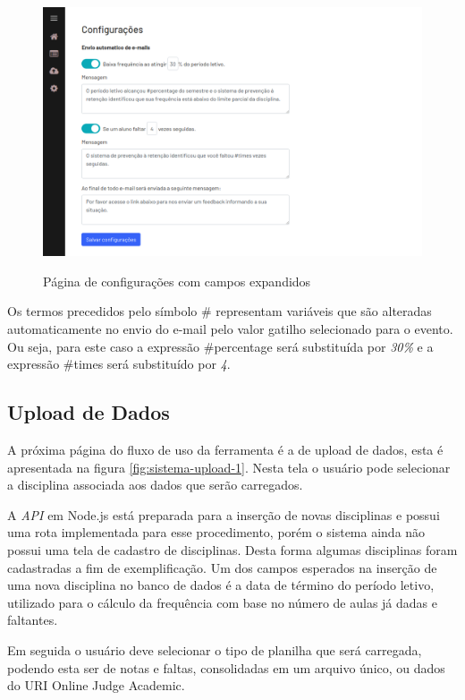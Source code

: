 \begin{figure}[!htb]
    \centering
    \caption{Página de configurações com campos expandidos}
    \includegraphics[width=1\textwidth]{./dados/figuras/sistema/sistema-configuracoes-2}
    \label{fig:sistema-configuracoes-2}
\end{figure}

Os termos precedidos pelo símbolo \# representam variáveis que são alteradas automaticamente no envio do e-mail pelo valor gatilho selecionado para o evento. Ou seja, para este caso a expressão \#percentage será substituída por \textit{30\%} e a expressão \#times será substituído por \textit{4}.

\subsection{Upload de Dados}
\label{ssec:uploadDados}

A próxima página do fluxo de uso da ferramenta é a de upload de dados, esta é apresentada na figura \ref{fig:sistema-upload-1}. Nesta tela o usuário pode selecionar a disciplina associada aos dados que serão carregados. 

A \textit{API} em Node.js está preparada para a inserção de novas disciplinas e possui uma rota implementada para esse procedimento, porém o sistema ainda não possui uma tela de cadastro de disciplinas. 
Desta forma algumas disciplinas foram cadastradas a fim de exemplificação. 
Um dos campos esperados na inserção de uma nova disciplina no banco de dados é a data de término do período letivo, utilizado para o cálculo da frequência com base no número de aulas já dadas e faltantes.

Em seguida o usuário deve selecionar o tipo de planilha que será carregada, podendo esta ser de notas e faltas, consolidadas em um arquivo único, ou dados do URI Online Judge Academic.


